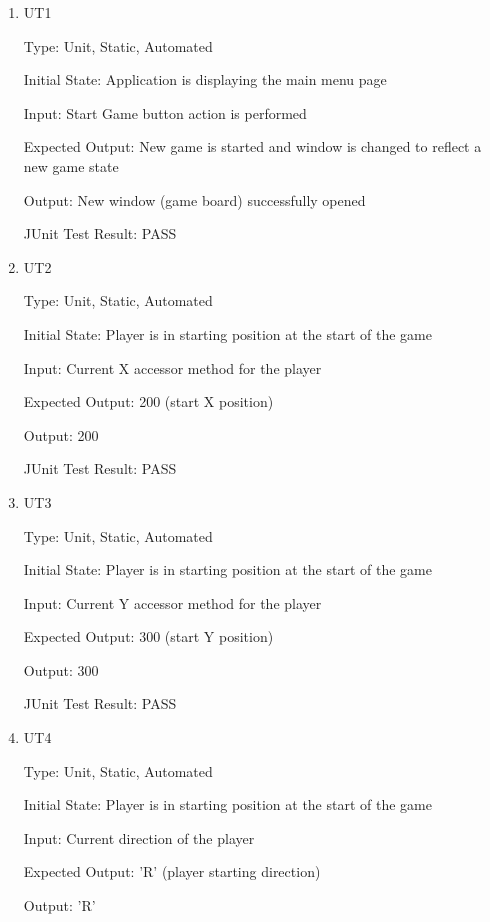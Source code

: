 \documentclass[12pt, titlepage]{article}
\begin{document}
\begin{enumerate}

\item{UT1\\}

Type: Unit, Static, Automated
					
Initial State: Application is displaying the main menu page
					
Input: Start Game button action is performed
					
Expected Output: New game is started and window is changed to reflect a new game state
					
Output: New window (game board) successfully opened

JUnit Test Result: PASS

\item{UT2\\}

Type: Unit, Static, Automated
					
Initial State: Player is in starting position at the start of the game
					
Input: Current X accessor method for the player
					
Expected Output: 200 (start X position)
					
Output: 200

JUnit Test Result: PASS

\item{UT3\\}

Type: Unit, Static, Automated
					
Initial State: Player is in starting position at the start of the game
					
Input: Current Y accessor method for the player
					
Expected Output: 300 (start Y position)
					
Output: 300

JUnit Test Result: PASS

\item{UT4\\}

Type: Unit, Static, Automated
					
Initial State: Player is in starting position at the start of the game
					
Input: Current direction of the player
					
Expected Output: 'R' (player starting direction)
					
Output: 'R'


\end{enumerate}
\end{document}
